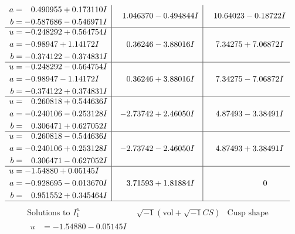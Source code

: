 \documentclass[1p]{elsarticle_modified}
\theoremstyle{definition}
\newcommand{\I}{\sqrt{-1}}
\begin{document}
$$\begin{array}{c|c|c}
\begin{aligned}
a &= \phantom{-}0.490955 + 0.173110 I \\
b &= -0.587686 - 0.546971 I\end{aligned}
 & \phantom{-}1.046370 - 0.494844 I & \phantom{-}10.64023 - 0.18722 I \\ \hline\begin{aligned}
u &= -0.248292 + 0.564754 I \\
a &= -0.98947 + 1.14172 I \\
b &= -0.374122 - 0.374831 I\end{aligned}
 & \phantom{-}0.36246 - 3.88016 I & \phantom{-}7.34275 + 7.06872 I \\ \hline\begin{aligned}
u &= -0.248292 - 0.564754 I \\
a &= -0.98947 - 1.14172 I \\
b &= -0.374122 + 0.374831 I\end{aligned}
 & \phantom{-}0.36246 + 3.88016 I & \phantom{-}7.34275 - 7.06872 I \\ \hline\begin{aligned}
u &= \phantom{-}0.260818 + 0.544636 I \\
a &= -0.240106 - 0.253128 I \\
b &= \phantom{-}0.306471 + 0.627052 I\end{aligned}
 & -2.73742 + 2.46050 I & \phantom{-}4.87493 - 3.38491 I \\ \hline\begin{aligned}
u &= \phantom{-}0.260818 - 0.544636 I \\
a &= -0.240106 + 0.253128 I \\
b &= \phantom{-}0.306471 - 0.627052 I\end{aligned}
 & -2.73742 - 2.46050 I & \phantom{-}4.87493 + 3.38491 I \\ \hline\begin{aligned}
u &= -1.54880 + 0.05145 I \\
a &= -0.928695 - 0.013670 I \\
b &= \phantom{-}0.951552 + 0.345464 I\end{aligned}
 & \phantom{-}3.71593 + 1.81884 I & \phantom{-0.000000 } 0\\
 \hline 
 \end{array}$$\newpage$$\begin{array}{c|c|c}  
\text{Solutions to }I^u_{1}& \I (\text{vol} + \sqrt{-1}CS) & \text{Cusp shape}\\
 \hline 
\begin{aligned}
u &= -1.54880 - 0.05145 I \\

\end{aligned}
\end{array}$$
\end{document}
